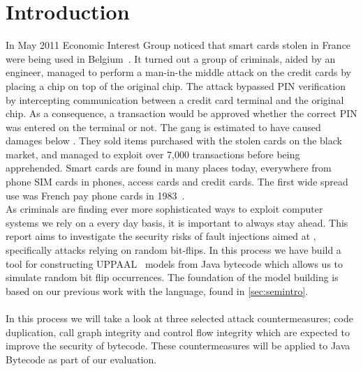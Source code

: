 \chapter{Introduction}
In May 2011 Economic Interest Group noticed that smart cards stolen in France were being used in Belgium~\cite{fun}. It turned out a group of criminals, aided by an engineer, managed to perform a man-in-the middle attack on the credit cards by placing a chip on top of the original chip. The attack bypassed PIN verification by intercepting communication between a credit card terminal and the original chip. As a consequence, a transaction would be approved whether the correct PIN was entered on the terminal or not. The gang is estimated to have caused damages below . They sold items purchased with the stolen cards on the black market, and managed to exploit over 7,000 transactions before being apprehended. Smart cards are found in many places today, everywhere from phone SIM cards in phones, access cards and credit cards. The first wide spread use was French pay phone cards in 1983~\cite[p. 366]{modbank}.\\

\noindent As criminals are finding ever more sophisticated ways to exploit computer systems we rely on a every day basis, it is important to always stay ahead.
This report aims to investigate the security risks of fault injections aimed at \jc, specifically attacks relying on random bit-flips. 
In this process we have build a tool for constructing UPPAAL~\cite{upptut} models from Java bytecode which allows us to simulate random bit flip occurrences. 
The foundation of the model building is based on our previous work with the \jcl language, found in \cref{sec:semintro}.\\\\
In this process we will take a look at three selected attack countermeasures; code duplication, call graph integrity and control flow integrity which are expected to improve the security of \jc bytecode. 
These countermeasures will be applied to Java Bytecode as part of our evaluation.

